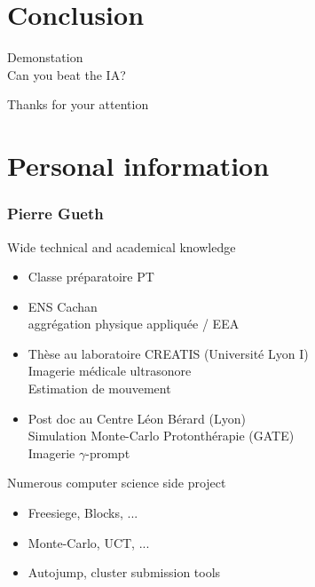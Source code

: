 \documentclass{beamer}
\begin{document}
\section{Conclusion}

\begin{frame}
\begin{center}
\Huge Demonstation \\ Can you beat the IA?
\end{center}
\end{frame}

\begin{frame}
\begin{center}
\Huge Thanks for your attention
\end{center}
\end{frame}

\section{Personal information}

\begin{frame}
\frametitle{Pierre Gueth}
\begin{block}{Wide technical and academical knowledge}
\begin{itemize}
\item Classe préparatoire PT
\item ENS Cachan \\ aggrégation physique appliquée / EEA
\item Thèse au laboratoire CREATIS (Université Lyon I) \\ Imagerie médicale ultrasonore \\ Estimation de mouvement
\item Post doc au Centre Léon Bérard (Lyon) \\ Simulation Monte-Carlo Protonthérapie (GATE) \\ Imagerie $\gamma$-prompt
\end{itemize}
\end{block}
\begin{block}{Numerous computer science side project}
\begin{itemize}
\item Freesiege, Blocks, ...
\item Monte-Carlo, UCT, ...
\item Autojump, cluster submission tools
\end{itemize}
\end{block}
\end{frame}
\end{document}
